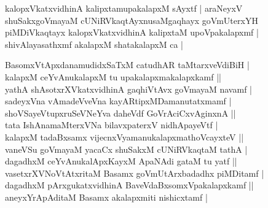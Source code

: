 \begin{entry}
\begin{shl}
kalopxVkatxvidhinA kalipxtamupakalapxM sAyxtf | araNeyxV\\[2pt]
shuSakxgoVmayaM cUNiRVkaqtAyxnusaMgaqhayx goVmUterxYH\\[2pt]
piMDiVkaqtayx kalopxVkatxvidhinA kalipxtaM upoVpakalapxmf |\\[2pt]
shivAlayasathxmf akalapxM shatakalapxM ca |\\[-1pt] 
\end{shl}
\medskip
{}
\smallskip
{}
\medskip
\begin{shl}
BasomxVtApxdanamudidxSaTxM catudhAR taMtarxveVdiBiH |\\[2pt]
kalapxM ceYvAnukalapxM tu upakalapxmakalapxkamf ||\\[2pt]
yathA shAsotxrXVkatxvidhinA gaqhiVtAvx goVmayaM navamf |\\[2pt]
sadeyxVna vAmadeVveVna kayARtipxMDamanutatxmamf |\\[2pt]
shoVSayeVtupxruSeVNeYva daheVdf GoVrAciCxvAginxnA ||\\[2pt]
tata IshAnamaMterxVNa bilavxpaterxV nidhApayeVtf |\\[2pt]
kalapxM tadaBxsamx vijecnxVyamanukalapxmathoVcayxteV ||\\[2pt]
vaneVSu goVmayaM yacaCx shuSakxM cUNiRVkaqtaM tathA |\\[2pt]
dagadhxM ceYvAnukalApxKayxM ApaNAdi gataM tu yatf ||\\[2pt]
vasetxrXVNoVtAtxritaM Basamx goVmUtArxbadadhx piMDitamf |\\[2pt]
dagadhxM pArxgukatxvidhinA BaveVdaBxsomxVpakalapxkamf ||\\[2pt]
aneyxYrApAditaM Basamx akalapxmiti nishicxtamf |\\[-1pt]
\end{shl}
\medskip
{}
\end{entry}

